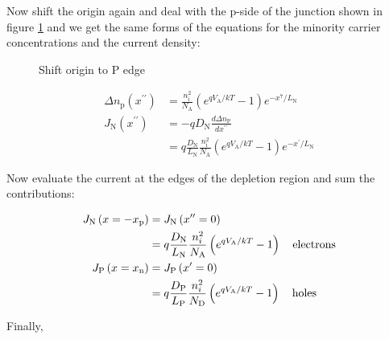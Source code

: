 \documentclass[main.tex]{subfiles}
\begin{document}
\begin{enumerate}
\begin{enumerate}
        Now shift the origin again and deal with the p-side of the junction shown in figure \ref{fig:18ad_b} and we get the same forms of the equations for the minority carrier concentrations and the current density:

        \begin{figure}
        \centering{}
        \caption{Shift origin to P edge}
        \label{fig:18ad_b}
        \end{figure}

        $$
        \begin{aligned}
        \Delta n_{\mathrm{p}}\left(x^{\prime \prime}\right) &= \frac{n_{\mathrm{i}}^2}{N_{\mathrm{A}}}\left(e^{q V_{\mathrm{A}} / k T}-1\right) e^{-x^7 / L_{\mathrm{N}}}\\
        J_{\mathrm{N}}\left(x^{\prime \prime}\right) &= -q D_{\mathrm{N}} \frac{d \Delta n_{\mathrm{P}}}{d x^{\prime \prime}}\\
        &= q \frac{D_{\mathrm{N}}}{L_{\mathrm{N}}} \frac{n_{\mathrm{i}}^2}{N_{\mathrm{A}}}\left(e^{q V_{\mathrm{A}} / k T}-1\right) e^{-x^{\prime} / L_{\mathrm{N}}}
        \end{aligned}
        $$

        Now evaluate the current at the edges of the depletion region and sum the contributions:

        $$
        \begin{aligned}            
        J_{\mathrm{N}}\left(x=-x_{\mathrm{p}}\right) &= J_{\mathrm{N}}\left(x^{\prime \prime}=0\right)\\
        &=q \frac{D_{\mathrm{N}}}{L_{\mathrm{N}}} \frac{n_i^2}{N_{\mathrm{A}}}\left(e^{q V_{\mathrm{A}} / k T}-1\right) \text{\quad electrons}\\
        J_{\mathrm{P}}\left(x=x_{\mathrm{n}}\right) &= J_{\mathrm{P}}\left(x^{\prime}=0\right)\\
        &=q \frac{D_{\mathrm{P}}}{L_{\mathrm{P}}} \frac{n_i^2}{N_{\mathrm{D}}}\left(e^{q V_{\mathrm{A}} / k T}-1\right) 
        \text{\quad holes}
        \end{aligned}
        $$

        Finally,


\end{enumerate}
\end{enumerate}
\end{document}
